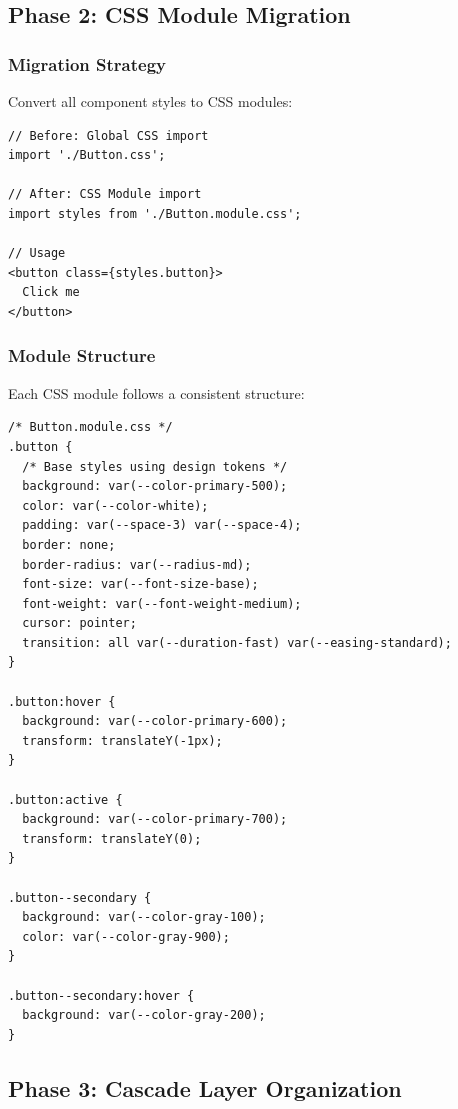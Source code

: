 \documentclass[11pt]{article}
\begin{document}
\subsection{Phase 2: CSS Module Migration}

\subsubsection{Migration Strategy}

Convert all component styles to CSS modules:

\begin{lstlisting}[style=typescript]
// Before: Global CSS import
import './Button.css';

// After: CSS Module import
import styles from './Button.module.css';

// Usage
<button class={styles.button}>
  Click me
</button>
\end{lstlisting}

\subsubsection{Module Structure}

Each CSS module follows a consistent structure:

\begin{lstlisting}[style=css]
/* Button.module.css */
.button {
  /* Base styles using design tokens */
  background: var(--color-primary-500);
  color: var(--color-white);
  padding: var(--space-3) var(--space-4);
  border: none;
  border-radius: var(--radius-md);
  font-size: var(--font-size-base);
  font-weight: var(--font-weight-medium);
  cursor: pointer;
  transition: all var(--duration-fast) var(--easing-standard);
}

.button:hover {
  background: var(--color-primary-600);
  transform: translateY(-1px);
}

.button:active {
  background: var(--color-primary-700);
  transform: translateY(0);
}

.button--secondary {
  background: var(--color-gray-100);
  color: var(--color-gray-900);
}

.button--secondary:hover {
  background: var(--color-gray-200);
}
\end{lstlisting}

\subsection{Phase 3: Cascade Layer Organization}
\end{document}
